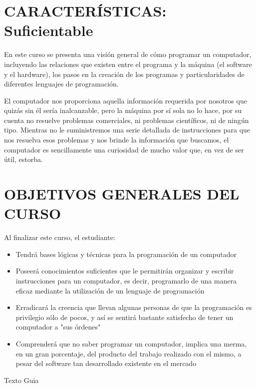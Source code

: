 

\section{CARACTERÍSTICAS: Suficientable}

En este curso se presenta una visión general de cómo programar un computador, incluyendo las relaciones que existen entre el programa y la máquina (el software y el hardware), los pasos en la creación de los programas y particularidades de diferentes lenguajes de programación.

El computador nos proporciona aquella información requerida por nosotros que quizás sin él sería inalcanzable, pero la máquina por sí sola no lo hace, por su cuenta no resuelve problemas comerciales, ni problemas científicos, ni de ningún tipo. Mientras no le suministremos una serie detallada de instrucciones para que nos resuelva esos problemas y nos brinde la información que buscamos, el computador es sencillamente una curiosidad de mucho valor que, en vez de ser útil, estorba.

\section{OBJETIVOS GENERALES DEL CURSO}

Al finalizar este curso, el estudiante:

\begin{itemize}
	\item Tendrá bases lógicas y técnicas para la programación de un computador 

	\item Poseerá conocimientos suficientes que le permitirán organizar y escribir instrucciones para un computador, es decir, programarlo de una manera eficaz mediante la utilización de un lenguaje de programación

	\item Erradicará la creencia que llevan algunas personas de que la programación es privilegio sólo de pocos, y así se sentirá bastante satisfecho de tener un computador a "sus órdenes"

	\item Comprenderá que no saber programar un computador, implica una merma, en un gran porcentaje, del producto del trabajo realizado con el mismo, a pesar del software tan desarrollado existente en el mercado
\end{itemize}

Texto Guia \cite{farrell2011programming}